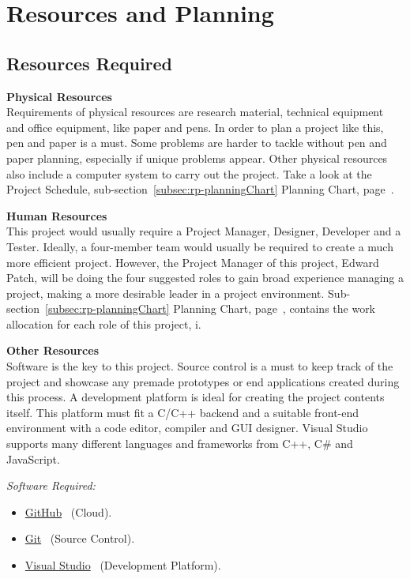 \documentclass[conference]{IEEEtran}
\begin{document}
    \section{Resources and Planning}
    \label{sec: resourcesPlanning}
      \subsection{Resources Required}
        \textbf{Physical Resources}\\
          Requirements of physical resources are research material, technical equipment and office equipment, like paper and pens. In order to plan a project like this, pen and paper is a must. Some problems are harder to tackle without pen and paper planning, especially if unique problems appear. Other physical resources also include a computer system to carry out the project. Take a look at the Project Schedule, sub-section~\ref{subsec:rp-planningChart} Planning Chart, page~\pageref{subsec:rp-planningChart}.

        \textbf{Human Resources}\\
          This project would usually require a Project Manager, Designer, Developer and a Tester. Ideally, a four-member team would usually be required to create a much more efficient project. However, the Project Manager of this project, Edward Patch, will be doing the four suggested roles to gain broad experience managing a project, making a more desirable leader in a project environment. Sub-section~\ref{subsec:rp-planningChart} Planning Chart, page~\pageref{subsec:rp-planningChart}, contains the work allocation for each role of this project, i.

        \textbf{Other Resources}\\
        Software is the key to this project. Source control is a must to keep track of the project and showcase any premade prototypes or end applications created during this process. A development platform is ideal for creating the project contents itself. This platform must fit a C/C++ backend and a suitable front-end environment with a code editor, compiler and GUI designer. Visual Studio supports many different languages and frameworks from C++, C\# and JavaScript.

        \textit{Software Required:}
        \begin{itemize}
          \item \href{https://github.com/}{GitHub}~\cite{github_github_nodate} (Cloud).
          \item \href{https://git-scm.com/}{Git}~\cite{git_git_nodate} (Source Control).
          \item \href{https://visualstudio.microsoft.com/}{Visual Studio}~\cite{microsoft_visual_nodate} (Development Platform).
        \end{itemize}
\end{document}
